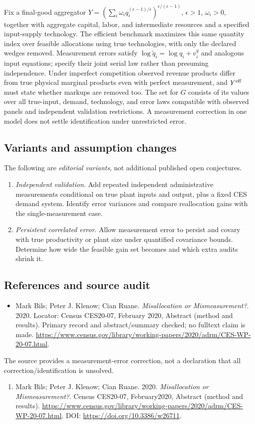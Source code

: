 \documentclass[11pt,a4paper]{article}
\begin{document}
Fix a final-good aggregator \(Y=(\sum_i\omega_iq_i^{(\epsilon-1)/\epsilon})^{\epsilon/(\epsilon-1)}\), \(\epsilon>1\), \(\omega_i>0\), together with aggregate capital, labor, and intermediate resources and a specified input-supply technology. The efficient benchmark maximizes this same quantity index over feasible allocations using true technologies, with only the declared wedges removed. Measurement errors satisfy \(\log\widetilde q_i=\log q_i+v_i^q\) and analogous input equations; specify their joint serial law rather than presuming independence. Under imperfect competition observed revenue products differ from true physical marginal products even with perfect measurement, and \(Y^{\rm eff}\) must state whether markups are removed too. The set for \(G\) consists of its values over all true-input, demand, technology, and error laws compatible with observed panels and independent validation restrictions. A measurement correction in one model does not settle identification under unrestricted error.
\subsection*{Variants and assumption changes}
The following are \emph{editorial variants}, not additional published open conjectures.
\begin{enumerate}
\item \emph{Independent validation.} Add repeated independent administrative measurements conditional on true plant inputs and output, plus a fixed CES demand system. Identify error variances and compare reallocation gains with the single-measurement case.
\item \emph{Persistent correlated error.} Allow measurement error to persist and covary with true productivity or plant size under quantified covariance bounds. Determine how wide the feasible gain set becomes and which extra audits shrink it.
\end{enumerate}
\subsection*{References and source audit}
\begin{itemize}
\item Mark Bils; Peter J. Klenow; Cian Ruane. \emph{Misallocation or Mismeasurement?}. 2020. Locator: Census CES20-07, February 2020, Abstract (method and results). Primary record and abstract/summary checked; no fulltext claim is made. \url{https://www.census.gov/library/working-papers/2020/adrm/CES-WP-20-07.html}.
\end{itemize}
The source provides a measurement-error correction, not a declaration that all correction/identification is unsolved.
\begin{enumerate}\raggedright
\item\hypertarget{definitions:source:30007543:1}{} Mark Bils; Peter J. Klenow; Cian Ruane. 2020. \emph{Misallocation or Mismeasurement?}. Census CES20-07, February2020, Abstract (method and results).
\url{https://www.census.gov/library/working-papers/2020/adrm/CES-WP-20-07.html}.
DOI: \url{https://doi.org/10.3386/w26711}.
\end{enumerate}
\end{document}
